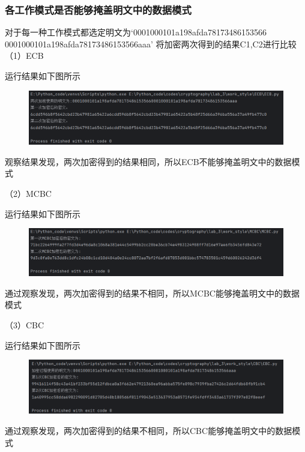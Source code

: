\documentclass[a4paper,11pt,UTF8]{ctexart}
\newcommand{\bottomcaption}{%
\setlength{\abovecaptionskip}{6pt}%
\setlength{\belowcaptionskip}{6pt}%
\caption}
\newcommand{\xiaowuhao}{\fontsize{9pt}{\baselineskip}\selectfont}   %
\begin{document}
        \subsubsection{各工作模式是否能够掩盖明文中的数据模式}
            对于每一种工作模式都选定明文为‘0001000101a198afda78173486153566\\
            0001000101a198afda78173486153566aaa'
            将加密两次得到的结果C1,C2进行比较
            （1）ECB\par
                运行结果如下图所示
                \begin{figure}[H]
                    \centering
                    \includegraphics[width=13cm]{ECB_result_1.png}
                    \bottomcaption{\xiaowuhao{ECB相同明文加密两次结果}}
                \end{figure}
                观察结果发现，两次加密得到的结果相同，所以ECB不能够掩盖明文中的数据模式\par

            （2）MCBC\par
            运行结果如下图所示
            \begin{figure}[H]
                \centering
                \includegraphics[width=13cm]{MCBC_result_1.png}
                \bottomcaption{\xiaowuhao{MCBC相同明文加密两次结果}}
            \end{figure}
            通过观察发现，两次加密得到的结果不相同，所以MCBC能够掩盖明文中的数据模式\par
\newpage
            （3）CBC\par
                运行结果如下图所示
                \begin{figure}[H]
                    \centering
                    \includegraphics[width=13cm]{CBC_result_1.png}
                    \bottomcaption{\xiaowuhao{CBC相同明文加密两次结果}}
                \end{figure}
                通过观察发现，两次加密得到的结果不相同，所以CBC能够掩盖明文中的数据模式\par
\end{document}
